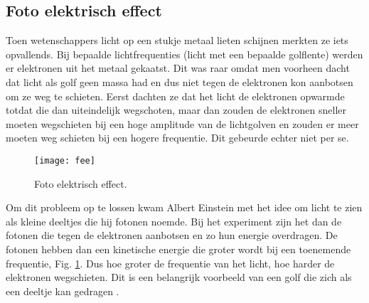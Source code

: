\documentclass[11pt,fleqn]{book} %
\begin{document}
\subsection{Foto elektrisch effect}
Toen wetenschappers licht op een stukje metaal lieten schijnen merkten ze iets opvallends. Bij bepaalde lichtfrequenties (licht met een bepaalde golflente) werden er elektronen uit het metaal gekaatst. Dit was raar omdat men voorheen dacht dat licht als golf geen massa had en dus niet tegen de elektronen kon aanbotsen om ze weg te schieten. Eerst dachten ze dat het licht de elektronen opwarmde totdat die dan uiteindelijk wegschoten, maar dan zouden de elektronen sneller moeten wegschieten bij een hoge amplitude van de lichtgolven en zouden er meer moeten weg  schieten bij een hogere frequentie. Dit gebeurde echter niet per se. 
\begin{figure}[h]
	\centering\texttt{[image: fee]}
	\caption{Foto elektrisch effect.}
	\label{fig:fee}
\end{figure}
Om dit probleem op te lossen kwam Albert Einstein met het idee om licht te zien als kleine deeltjes die hij fotonen noemde. Bij het experiment zijn het dan de fotonen die tegen de elektronen aanbotsen en zo hun energie overdragen. De fotonen hebben dan een kinetische energie die groter wordt bij een toenemende frequentie, Fig. \ref{fig:fee}. Dus hoe groter de frequentie van het licht, hoe harder de elektronen wegschieten. Dit is een belangrijk voorbeeld van een golf die zich als een deeltje kan gedragen \cite{fee}.
\end{document}
